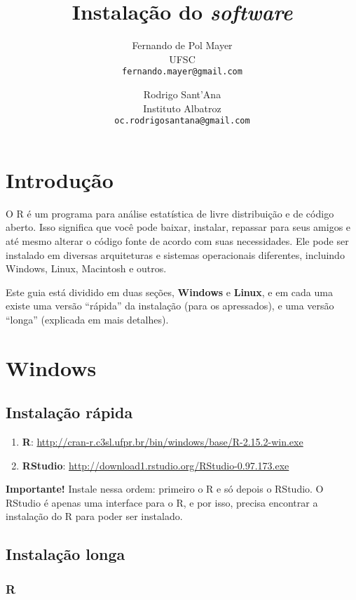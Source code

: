 \documentclass[a4paper,12pt]{article}\usepackage{graphicx, color}
\title{Instalação do \textit{software} \R}
\author{Fernando de Pol Mayer \\
  UFSC \\
  \texttt{fernando.mayer@gmail.com} \and Rodrigo Sant'Ana \\
  Instituto Albatroz \\
  \texttt{oc.rodrigosantana@gmail.com}}
\date{}
\providecommand{\R}{\textsf{R}\xspace}
\providecommand{\RStudio}{\textsf{RStudio}\xspace}
\begin{document}
\maketitle
\tableofcontents

\section{Introdução}

O \R é um programa para análise estatística de livre distribuição e de
código aberto. Isso significa que você pode baixar, instalar, repassar
para seus amigos e até mesmo alterar o código fonte de acordo com suas
necessidades. Ele pode ser instalado em diversas arquiteturas e sistemas
operacionais diferentes, incluindo Windows, Linux, Macintosh e
outros.

Este guia está dividido em duas seções, \textbf{Windows} e
\textbf{Linux}, e em cada uma existe uma versão ``rápida'' da instalação
(para os apressados), e uma versão ``longa'' (explicada em mais
detalhes).

\section{Windows}

\subsection{Instalação rápida}

\begin{enumerate}
\item \textbf{\R}:
  \url{http://cran-r.c3sl.ufpr.br/bin/windows/base/R-2.15.2-win.exe}
\item \textbf{\RStudio}:
  \url{http://download1.rstudio.org/RStudio-0.97.173.exe}
\end{enumerate}

\textbf{Importante!} Instale nessa ordem: primeiro o \R e só depois o
\RStudio. O \RStudio é apenas uma interface para o \R, e por isso,
precisa encontrar a instalação do \R para poder ser instalado.

\subsection{Instalação longa}

\subsubsection{\R}
\end{document}
